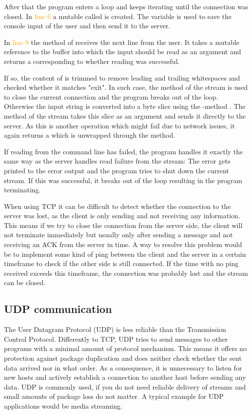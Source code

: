 After that the program enters a loop and keeps iterating until the connection was closed. In \textcolor{orange}{line 6}
a mutable  called  is created. The variable is used to save the console input of the user and
then send it to the server.

In \textcolor{orange}{line 8} the method  of  receives the next line from the user. It
takes a mutable reference to the buffer into which the input should be read as an argument and returns a 
corresponding to whether reading was successful.

If so, the content of  is trimmed to remove leading and trailing whitespaces and checked whether it matches
"exit". In such case, the  method of the stream is used to close the current connection and the program
breaks out of the loop. Otherwise the input string is converted into a byte slice using the -method
. The method  of the stream takes this slice as an argument and sends it directly to the
server. As this is another operation which might fail due to network issues, it again returns a  which is
unwrapped through the  method.

If reading from the command line has failed, the program handles it exactly the same way as the server handles read
failure from the stream: The error gets printed to the error output and the program tries to shut down the current
stream. If this was successful, it breaks out of the loop resulting in the program terminating.

When using TCP it can be difficult to detect whether the connection to the server was lost, as the client is only
sending and not receiving any information. This means if we try to close the connection from the server side, the
client will not terminate immediately but usually only after sending a message and not receiving an ACK from the server
in time. A way to resolve this problem would be to implement some kind of ping between the client and the server in a
certain timeframe to check if the other side is still connected. If the time with no ping received exceeds this
timeframe, the connection was probably lost and the stream can be closed.

\subsection{UDP communication}
The User Datagram Protocol (UDP) is less reliable than the Transmission Control Protocol. Differently to TCP, UDP tries
to send messages to other programs with a minimal amount of protocol mechanism. This means it offers no protection
against package duplication and does neither check whether the sent data arrived nor in what order. As a consequence,
it is unnecessary to listen for new hosts and actively establish a connection to another host before sending any data.
UDP is commonly used, if you do not need reliable delivery of streams and small amounts of package loss do not matter.
A typical example for UDP applications would be media streaming. \cite{RFC0768}

